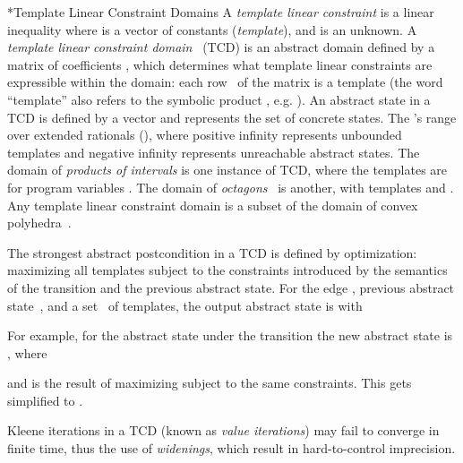 \documentclass{llncs}
\makeatletter
\renewcommand{\paragraph}{\@startsection{paragraph}{4}{\z@}{0.8ex \@plus 0ex \@minus 1ex}{-1em}{\normalfont\normalsize\bfseries}}
\makeatother
\begin{document}
\paragraph*{Template Linear Constraint Domains}
A \emph{template linear constraint} is a linear inequality 
where  is a vector of constants (\emph{template}), and  is an unknown.
A \emph{template linear constraint domain}~\cite{template_constraints_domain}
(TCD) is
an abstract domain defined by a matrix of coefficients , which
determines what template linear constraints are expressible within the domain:
each row~ of the matrix is a template (the word ``template'' also refers to the symbolic product , e.g. ).
An abstract state in a TCD is defined by a vector
 and represents the set
 of concrete states.
The 's range over extended rationals (), where positive infinity represents unbounded templates and
negative infinity represents unreachable abstract states.
The domain of \emph{products of intervals} is one instance of TCD, where
the templates are  for program variables .
The domain of \emph{octagons}~\cite{DBLP:journals/lisp/Mine06} is another, with
templates  and .
Any template linear constraint domain is a subset of the domain of convex polyhedra~\cite{cousot78}.

The strongest abstract postcondition in a TCD is
defined by optimization: maximizing all templates subject to the
constraints introduced by the
semantics of the transition and the previous abstract state.
For the edge , previous abstract state~, and a set~ of templates,
the output abstract state is  with


For example, for the abstract state  under the transition
 the new abstract state is , where

and
 is the result of maximizing  subject to the same constraints.
This gets simplified to .

Kleene iterations in a TCD (known as \emph{value iterations}) may
fail to converge in finite time, thus the use of \emph{widenings}, which result in hard-to-control imprecision.
\end{document}
